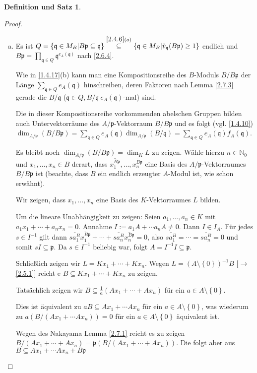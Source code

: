 \documentclass[
twoside=semi,
fontsize=12,
DIV=12, 
cleardoublepage=current,
leqno,
headings=optiontoheadandtoc, 
toc=idx
]{scrbook}
\newcommand{\N}{\mathbb{N}}
\newcommand{\set}[1]{\left\{ #1 \right\}}
\theoremstyle{definition}
\newtheorem{def-satz}[definition]{Definition und Satz}
\begin{document}
\begin{def-satz}
\begin{proof}
\begin{enumerate}[(a)]
 				
 				\item 
 				Es ist $Q = \set{\mathfrak{q} \in M_B| B\mathfrak{p} \subseteq \mathfrak{q}} \overset{\ref{2.4.6}(a)}{\subseteq} \set{\mathfrak{q} \in M_B| \tilde{v}_\mathfrak{q}(B\mathfrak{p}) \geq 1} $ endlich und $B\mathfrak{p} = \prod_{\mathfrak{q} \in Q} \mathfrak{q}^{e_A(\mathfrak{q})}$ nach \ref{2.6.4}.
 				
 				Wie in \ref{1.4.17}(b) kann man eine Kompositionsreihe des $B$-Moduls $B/B\mathfrak{p}$ der L\"ange $\sum_{\mathfrak{q} \in Q} e_A(\mathfrak{q})$ hinschreiben, deren Faktoren nach Lemma \ref{2.7.3} gerade die $B/\mathfrak{q}$ ($\mathfrak{q} \in Q, B/\mathfrak{q} \ e_A(\mathfrak{q})$-mal) sind.
 				
 				Die in dieser Kompositionsreihe vorkommenden abelschen Gruppen bilden auch Untervektorr\"aume des $A/\mathfrak{p}$-Vektorraum $B/B\mathfrak{p}$ und es folgt (vgl. \ref{1.4.10}) $\dim_{A/\mathfrak{p}} (B/B\mathfrak{p}) = \sum_{\mathfrak{q} \in Q} e_A(\mathfrak{q})\dim_{A/\mathfrak{p}} (B/\mathfrak{q}) = \sum_{\mathfrak{q} \in Q} e_A(\mathfrak{q})f_A(\mathfrak{q})$.
 				
 				Es bleibt noch $\dim_{A/\mathfrak{p}}(B/B\mathfrak{p}) = \dim_K L$ zu zeigen. W\"ahle hierzu $n \in \N_0$ und $x_1, \dots, x_n \in B$ derart, dass $\overline{x_1^{B\mathfrak{p}}}, \dots, \overline{x_n^{B\mathfrak{p}}}$ eine Basis des $A/\mathfrak{p}$-Vektorraumes $B/B\mathfrak{p}$ ist (beachte, dass $B$ ein endlich erzeugter $A$-Modul ist, wie schon erw\"ahnt).
 				
 				Wir zeigen, dass $x_1, \dots, x_n$ eine Basis des $K$-Vektorraumes $L$ bilden.
 				
 				Um die lineare Unabh\"angigkeit zu zeigen: Seien $a_1, \dots, a_n \in K$ mit $a_1x_1 + \cdots + a_nx_n = 0$. Annahme $I:= a_1A + \cdots a_nA \neq 0$. Dann $I \in I_A$. F\"ur jedes $s \in I^{-1}$ gilt dann $\overline{sa_1^{B}}\overline{x_1^{B\mathfrak{p}}} + \cdots + \overline{sa_n^{B}}\overline{x_n^{B\mathfrak{p}}} = 0$, also $\overline{sa_1^{B}} = \cdots = \overline{sa_n^{B}}  = 0$ und somit $sI \subseteq \mathfrak{p}$. Da $s\in I^{-1}$ beliebig war, folgt $A = I^{-1}I \subseteq \mathfrak{p}$.
 				
 				Schlie\ss lich zeigen wir $L = Kx_1 + \cdots + Kx_n$. Wegen $L = (A \setminus \set{0})^{-1}B$ [$\to$ \ref{2.5.1}] reicht e $B \subseteq Kx_1 + \cdots + Kx_n$ zu zeigen.  
 				
 				Tats\"achlich zeigen wir $B \subseteq \frac{1}{a} (Ax_1 + \cdots + Ax_n)$ f\"ur ein $a \in A \setminus \set{0}$.
 				
 				Dies ist \"aquivalent zu $aB \subseteq Ax_1 + \cdots Ax_n$ f\"ur ein $a \in A \setminus \set{0}$, was wiederum zu $a(B/(Ax_1 + \cdots Ax_n)) = 0$ f\"ur ein $a \in A \setminus \set{0}$ \"aquivalent ist.
 				
 				Wegen des Nakayama Lemma \ref{2.7.1} reicht es zu zeigen $B/(Ax_1 + \cdots+ Ax_n) = \mathfrak{p}(B/(Ax_1 + \cdots + Ax_n))$. Die folgt aber aus $B \subseteq Ax_1 
 				+ \cdots Ax_n + B\mathfrak{p}$
 			\end{enumerate}
 		\end{proof}
 	\end{def-satz}
 	
\end{document}
